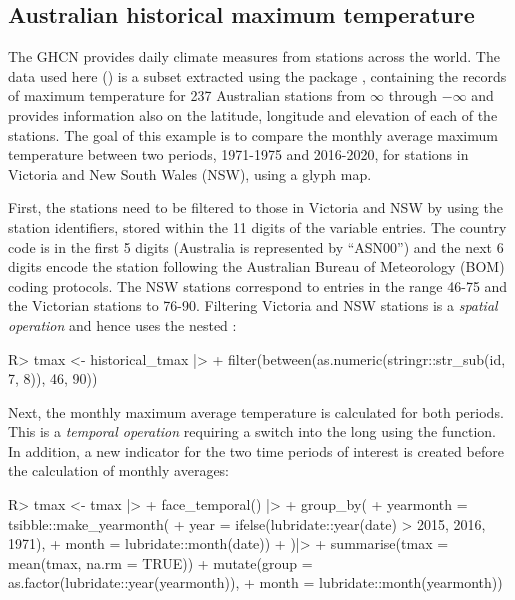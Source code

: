 \documentclass[
  shortnames]{jss}
\begin{document}
\hypertarget{historicaltmax}{%
\subsection{Australian historical maximum temperature}\label{historicaltmax}}

The GHCN provides daily climate measures from stations across the world. The data used here () is a subset extracted using the package  \citep{rnoaa}, containing the records of maximum temperature for 237 Australian stations from \ensuremath{\infty{}} through \ensuremath{-\infty{}} and provides information also on the latitude, longitude and elevation of each of the stations. The goal of this example is to compare the monthly average maximum temperature between two periods, 1971-1975 and 2016-2020, for stations in Victoria and New South Wales (NSW), using a glyph map.

First, the stations need to be filtered to those in Victoria and NSW by using the station identifiers, stored within the 11 digits of the  variable entries. The country code is in the first 5 digits (Australia is represented by ``ASN00'') and the next 6 digits encode the station following the Australian Bureau of Meteorology (BOM) \citep{bom} coding protocols. The NSW stations correspond to entries in the range 46-75 and the Victorian stations to 76-90. Filtering Victoria and NSW stations is a \emph{spatial operation} and hence uses the nested :

\begin{CodeChunk}
\begin{CodeInput}
R> tmax <- historical_tmax |>
+   filter(between(as.numeric(stringr::str_sub(id, 7, 8)), 46, 90))
\end{CodeInput}
\end{CodeChunk}

Next, the monthly maximum average temperature is calculated for both periods. This is a \emph{temporal operation} requiring a switch into the long  using the  function. In addition, a new indicator for the two time periods of interest is created before the calculation of monthly averages:

\begin{CodeChunk}
\begin{CodeInput}
R> tmax <- tmax |>
+   face_temporal() |> 
+   group_by(
+     yearmonth = tsibble::make_yearmonth(
+       year = ifelse(lubridate::year(date) > 2015, 2016, 1971),
+       month = lubridate::month(date))
+       )|>
+   summarise(tmax = mean(tmax, na.rm = TRUE)) %
+   mutate(group = as.factor(lubridate::year(yearmonth)),
+          month = lubridate::month(yearmonth))
\end{CodeInput}
\end{CodeChunk}
\end{document}
